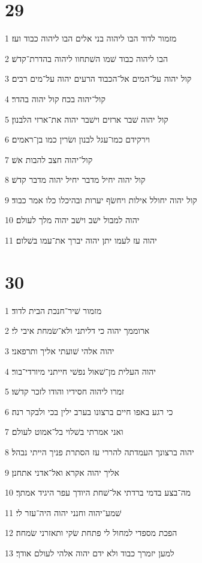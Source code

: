 \chapter{29}

\par 1 מזמור לדוד הבו ליהוה בני אלים הבו ליהוה כבוד ועז׃
\par 2 הבו ליהוה כבוד שׁמו השׁתחוו ליהוה בהדרת־קדשׁ׃
\par 3 קול יהוה על־המים אל־הכבוד הרעים יהוה על־מים רבים׃
\par 4 קול־יהוה בכח קול יהוה בהדר׃
\par 5 קול יהוה שׁבר ארזים וישׁבר יהוה את־ארזי הלבנון׃
\par 6 וירקידם כמו־עגל לבנון ושׂרין כמו בן־ראמים׃
\par 7 קול־יהוה חצב להבות אשׁ׃
\par 8 קול יהוה יחיל מדבר יחיל יהוה מדבר קדשׁ׃
\par 9 קול יהוה יחולל אילות ויחשׂף יערות ובהיכלו כלו אמר כבוד׃
\par 10 יהוה למבול ישׁב וישׁב יהוה מלך לעולם׃
\par 11 יהוה עז לעמו יתן יהוה יברך את־עמו בשׁלום׃

\chapter{30}

\par 1 מזמור שׁיר־חנכת הבית לדוד׃
\par 2 ארוממך יהוה כי דליתני ולא־שׂמחת איבי לי׃
\par 3 יהוה אלהי שׁועתי אליך ותרפאני׃
\par 4 יהוה העלית מן־שׁאול נפשׁי חייתני מיורדי־בור׃
\par 5 זמרו ליהוה חסידיו והודו לזכר קדשׁו׃
\par 6 כי רגע באפו חיים ברצונו בערב ילין בכי ולבקר רנה׃
\par 7 ואני אמרתי בשׁלוי בל־אמוט לעולם׃
\par 8 יהוה ברצונך העמדתה להררי עז הסתרת פניך הייתי נבהל׃
\par 9 אליך יהוה אקרא ואל־אדני אתחנן׃
\par 10 מה־בצע בדמי ברדתי אל־שׁחת היודך עפר היגיד אמתך׃
\par 11 שׁמע־יהוה וחנני יהוה היה־עזר לי׃
\par 12 הפכת מספדי למחול לי פתחת שׂקי ותאזרני שׂמחה׃
\par 13 למען יזמרך כבוד ולא ידם יהוה אלהי לעולם אודך׃

